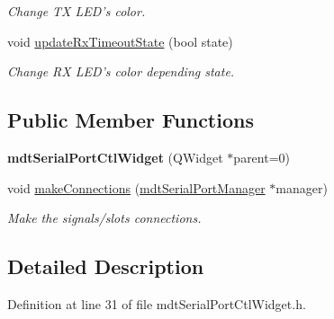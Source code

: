 \begin{DoxyCompactItemize}
\begin{DoxyCompactList}\small\item\em Change TX LED's color. \end{DoxyCompactList}\item 
\hypertarget{classmdt_serial_port_ctl_widget_a5cbb9a5ef4098dec46a9330372dc882c}{
void \hyperlink{classmdt_serial_port_ctl_widget_a5cbb9a5ef4098dec46a9330372dc882c}{updateRxTimeoutState} (bool state)}
\label{classmdt_serial_port_ctl_widget_a5cbb9a5ef4098dec46a9330372dc882c}

\begin{DoxyCompactList}\small\item\em Change RX LED's color depending state. \end{DoxyCompactList}\end{DoxyCompactItemize}
\subsection*{Public Member Functions}
\begin{DoxyCompactItemize}
\item 
\hypertarget{classmdt_serial_port_ctl_widget_ae2fac54a22a572b5f3348322a27cced9}{
{\bfseries mdtSerialPortCtlWidget} (QWidget $\ast$parent=0)}
\label{classmdt_serial_port_ctl_widget_ae2fac54a22a572b5f3348322a27cced9}

\item 
void \hyperlink{classmdt_serial_port_ctl_widget_a9dce60a846cbf24d7ceab099ff147c18}{makeConnections} (\hyperlink{classmdt_serial_port_manager}{mdtSerialPortManager} $\ast$manager)
\begin{DoxyCompactList}\small\item\em Make the signals/slots connections. \end{DoxyCompactList}\end{DoxyCompactItemize}


\subsection{Detailed Description}


Definition at line 31 of file mdtSerialPortCtlWidget.h.



